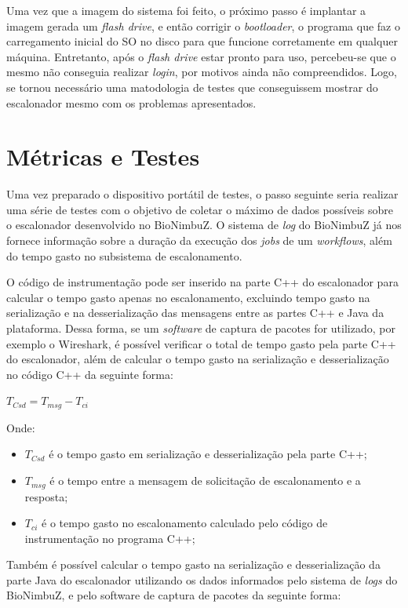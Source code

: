 Uma vez que a imagem do sistema foi feito, o próximo passo é implantar a imagem gerada um \textit{flash drive}, e então corrigir o \textit{bootloader}, o programa que faz o carregamento inicial do \acrshort{SO} no disco para que funcione corretamente em qualquer máquina. Entretanto, após o \textit{flash drive} estar pronto para uso, percebeu-se que o mesmo não conseguia realizar \textit{login}, por motivos ainda não compreendidos. Logo, se tornou necessário uma matodologia de testes que conseguissem mostrar do escalonador mesmo com os problemas apresentados.

\section{Métricas e Testes}

Uma vez preparado o dispositivo portátil de testes, o passo seguinte seria realizar uma série de testes com o objetivo de coletar o máximo de dados possíveis sobre o escalonador desenvolvido no BioNimbuZ. O sistema de \textit{log} do BioNimbuZ já nos fornece informação sobre a duração da execução dos \textit{jobs} de um \textit{workflows}, além do tempo gasto no subsistema de escalonamento. 

O código de instrumentação pode ser inserido na parte C++ do escalonador para calcular o tempo gasto apenas no escalonamento, excluindo tempo gasto na serialização e na desserialização das mensagens entre as partes C++ e Java da plataforma. Dessa forma, se um \textit{software} de captura de pacotes for utilizado, por exemplo o Wireshark\cite{Wireshark}, é possível verificar o total de tempo gasto pela parte C++ do escalonador, além de calcular o tempo gasto na serialização e desserialização no código C++ da seguinte forma:

\centerline{ $T_{Csd} = T_{msg} - T_{ci}$ }

Onde: 
 \begin{itemize}
 	\item $T_{Csd}$ é o tempo gasto em serialização e desserialização pela parte C++;
 	\item $T_{msg}$ é o tempo entre a mensagem de solicitação de escalonamento e a resposta;
 	\item $T_{ci}$ é o tempo gasto no escalonamento calculado pelo código de instrumentação no programa C++;
 \end{itemize}

Também é possível calcular o tempo gasto na serialização e desserialização da parte Java do escalonador utilizando os dados informados pelo sistema de \textit{logs} do BioNimbuZ, e pelo software de captura de pacotes da seguinte forma:

